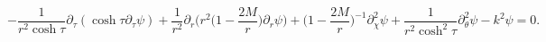 \begin{equation} \label{boundary s bubble wave equation}
- \frac{1}{r^2 \cosh \tau} \partial _\tau (\cosh \tau \partial _\tau \psi) + \frac{1}{r^2} \partial _r \biggl( r^2 \biggl( 1 - \frac{2M}{r}
\biggr) \partial _r \psi \biggr) + \biggl (1 - \frac{2M}{r} \biggr) ^{-1} \partial ^2 _\chi \psi + \frac{1}{r^2 \cosh ^2 \tau} \partial
_\theta ^2 \psi - k^2 \psi = 0.
\end{equation}

